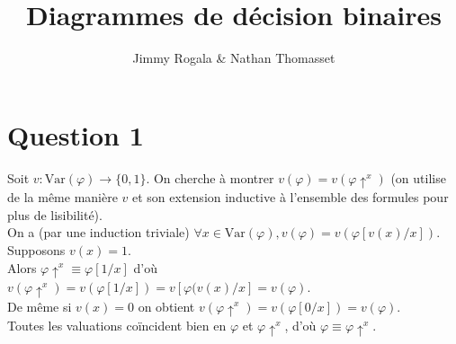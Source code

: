 \documentclass[12pt]{article}
\title{Diagrammes de décision binaires}
\author{Jimmy Rogala \& Nathan Thomasset}
\begin{document}
\maketitle

\section*{Question 1}

Soit $ v : \text{Var}(\varphi) \to \{0, 1\}$. On cherche à montrer $v(\varphi) = v(\varphi\uparrow^{x})$ (on utilise de la même manière $v$ et son extension inductive à l'ensemble des formules pour plus de lisibilité). \\
On a (par une induction triviale) $\forall x \in \text{Var}(\varphi), v(\varphi)=v(\varphi[v(x)/x])$. \\
Supposons $v(x)=1$. \\
Alors $\varphi\uparrow^{x} \equiv \varphi[1/x]$ d'où $v(\varphi\uparrow^{x})=v(\varphi[1/x])=v[\varphi(v(x)/x]=v(\varphi)$. \\
De même si $v(x)=0$ on obtient $v(\varphi\uparrow^{x})=v(\varphi[0/x])=v(\varphi)$. \\
Toutes les valuations coïncident bien en $\varphi$ et $\varphi\uparrow^{x}$, d'où $\varphi \equiv \varphi\uparrow^{x}$.
\end{document}
